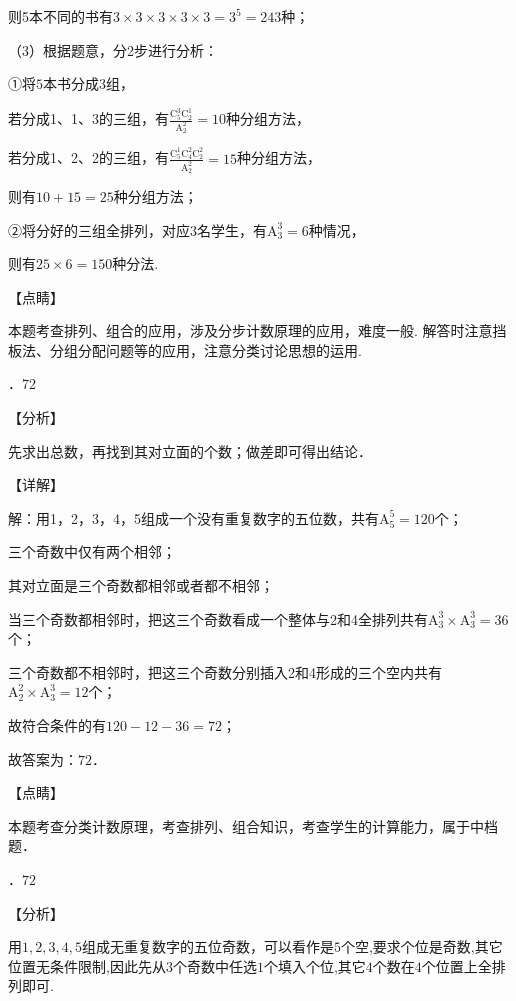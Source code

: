 \noindent 则5本不同的书有$3\times 3\times 3\times 3\times 3=3^{5} =243$种；

\noindent （3）根据题意，分2步进行分析：

\noindent ①将$5$本书分成$3$组，

\noindent 若分成1、1、3的三组，有$\frac{\mathrm C_{5}^{3} \mathrm C_{2}^{1} }{\mathrm A_{2}^{2} } =10$种分组方法，

\noindent 若分成1、2、2的三组，有$\frac{\mathrm C_{5}^{1} \mathrm C_{4}^{2} \mathrm C_{2}^{2} }{\mathrm A_{2}^{2} } =15$种分组方法，

\noindent 则有$10+15=25$种分组方法；

\noindent ②将分好的三组全排列，对应$3$名学生，有$\mathrm A_{3}^{3} =6$种情况，

\noindent 则有$25\times 6=150$种分法.

\noindent 【点睛】

\noindent 本题考查排列、组合的应用，涉及分步计数原理的应用，难度一般. 解答时注意挡板法、分组分配问题等的应用，注意分类讨论思想的运用.

．72

\noindent 【分析】

\noindent 先求出总数，再找到其对立面的个数；做差即可得出结论．

\noindent 【详解】

\noindent 解：用1，2，3，4，5组成一个没有重复数字的五位数，共有$\mathrm A_{5}^{5} =120$个；

\noindent 三个奇数中仅有两个相邻；

\noindent 其对立面是三个奇数都相邻或者都不相邻；

\noindent 当三个奇数都相邻时，把这三个奇数看成一个整体与2和4全排列共有$\mathrm A_{3}^{3} \times \mathrm A_{3}^{3} =36$个；

\noindent 三个奇数都不相邻时，把这三个奇数分别插入2和4形成的三个空内共有$\mathrm A_{2}^{2} \times \mathrm A_{3}^{3} =12$个；

\noindent 故符合条件的有$120-12-36=72$；

\noindent 故答案为：$72$．

\noindent 【点睛】

\noindent 本题考查分类计数原理，考查排列、组合知识，考查学生的计算能力，属于中档题．

．$72$

\noindent 【分析】

\noindent 用$1,2,3,4,5$组成无重复数字的五位奇数，可以看作是$5$个空,要求个位是奇数,其它位置无条件限制,因此先从$3$个奇数中任选$1$个填入个位,其它$4$个数在$4$个位置上全排列即可.

